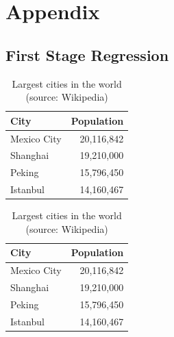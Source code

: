 \documentclass[
11pt,notheorems,compress,hyperref={pdfauthor=Maghfira Ramadhani}
]{beamer}
\begin{document}
\appendix
\section{Appendix}
\subsection{First Stage Regression}
\begin{frame}
    \begin{table}
        \caption{Largest cities in the world (source: Wikipedia)}
        \begin{tabular}{@{} lr @{}}
          \toprule
          City & Population\\
          \midrule
          Mexico City & 20,116,842\\
          Shanghai & 19,210,000\\
          Peking & 15,796,450\\
          Istanbul & 14,160,467\\
          \bottomrule
        \end{tabular}
        \hspace*{1cm}
            \setlength\extrarowheight{3pt}
        \begin{tabular}{|lr|}
          \hline
          \rowcolor{primary}\color{white}City & \color{white}Population\\
          \hline
          Mexico City & 20,116,842\\
          Shanghai & 19,210,000\\
          Peking & 15,796,450\\
          Istanbul & 14,160,467\\
          \hline
        \end{tabular}
    \end{table}
\end{frame}
\end{document}
